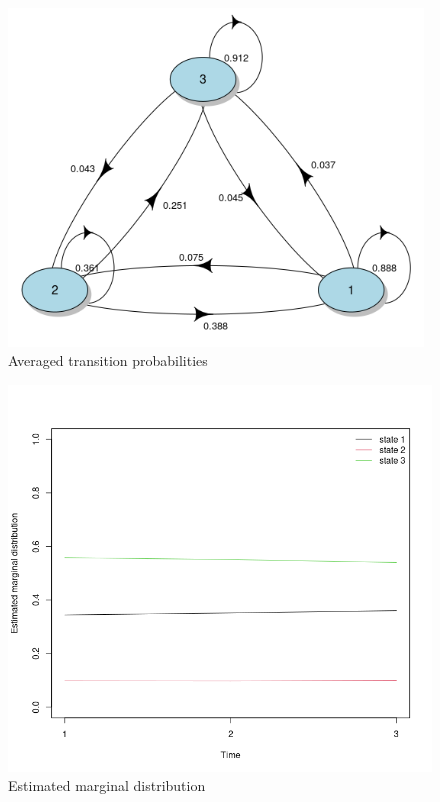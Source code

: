 \begin{figure}[htp]
    \centering
    \includegraphics[width=11cm]{output/plot_transition.png}
    \caption{Averaged transition probabilities}
        \label{fig:trans}
\end{figure}

\begin{figure}[htp]
    \centering
    \includegraphics[width=13cm]{output/emd_plot.png}
    \caption{Estimated marginal distribution}
        \label{fig:emd}
\end{figure}



